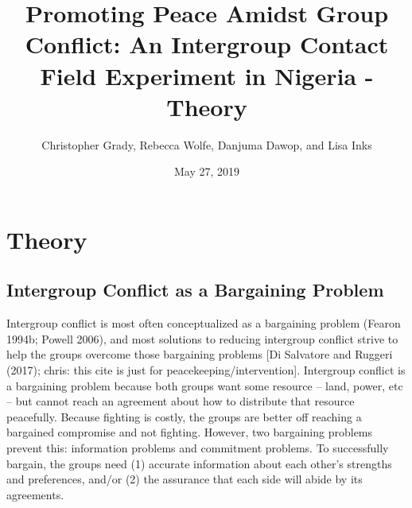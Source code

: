 \documentclass[11pt]{article}
\title{Promoting Peace Amidst Group Conflict: An Intergroup Contact Field
Experiment in Nigeria - Theory}
\author{
Christopher Grady, Rebecca Wolfe, Danjuma Dawop, and Lisa Inks
}
\date{May 27, 2019}
\begin{document}
\VerbatimFootnotes

%
%
%
%
%
%
%
%
%
%

\maketitle

\section{Theory}\label{theory}

\subsection{Intergroup Conflict as a Bargaining
Problem}\label{intergroup-conflict-as-a-bargaining-problem}

Intergroup conflict is most often conceptualized as a bargaining problem
(Fearon 1994b; Powell 2006), and most solutions to reducing intergroup
conflict strive to help the groups overcome those bargaining problems
{[}Di Salvatore and Ruggeri (2017); chris: this cite is just for
peacekeeping/intervention{]}. Intergroup conflict is a bargaining
problem because both groups want some resource -- land, power, etc --
but cannot reach an agreement about how to distribute that resource
peacefully. Because fighting is costly, the groups are better off
reaching a bargained compromise and not fighting. However, two
bargaining problems prevent this: information problems and commitment
problems. To successfully bargain, the groups need (1) accurate
information about each other's strengths and preferences, and/or (2) the
assurance that each side will abide by its agreements.
\end{document}
